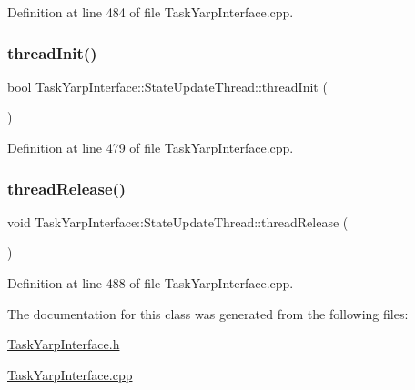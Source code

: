 Definition at line 484 of file Task\+Yarp\+Interface.\+cpp.

\hypertarget{classocra_1_1TaskYarpInterface_1_1StateUpdateThread_afb9499707c2ea4b76bb108d74294b1fb}{}\label{classocra_1_1TaskYarpInterface_1_1StateUpdateThread_afb9499707c2ea4b76bb108d74294b1fb} 
\subsubsection{\texorpdfstring{thread\+Init()}{threadInit()}}
{\footnotesize\ttfamily bool Task\+Yarp\+Interface\+::\+State\+Update\+Thread\+::thread\+Init (\begin{DoxyParamCaption}{ }\end{DoxyParamCaption})}



Definition at line 479 of file Task\+Yarp\+Interface.\+cpp.

\hypertarget{classocra_1_1TaskYarpInterface_1_1StateUpdateThread_a77b5d075d27975a99cffad39664df76b}{}\label{classocra_1_1TaskYarpInterface_1_1StateUpdateThread_a77b5d075d27975a99cffad39664df76b} 
\subsubsection{\texorpdfstring{thread\+Release()}{threadRelease()}}
{\footnotesize\ttfamily void Task\+Yarp\+Interface\+::\+State\+Update\+Thread\+::thread\+Release (\begin{DoxyParamCaption}{ }\end{DoxyParamCaption})}



Definition at line 488 of file Task\+Yarp\+Interface.\+cpp.



The documentation for this class was generated from the following files\+:\begin{DoxyCompactItemize}
\item 
\hyperlink{TaskYarpInterface_8h}{Task\+Yarp\+Interface.\+h}\item 
\hyperlink{TaskYarpInterface_8cpp}{Task\+Yarp\+Interface.\+cpp}\end{DoxyCompactItemize}
